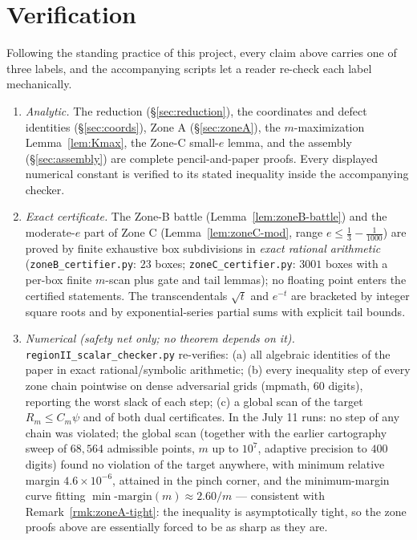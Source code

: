 \documentclass[11pt]{article}
\begin{document}
\section{Verification}\label{sec:verification}

Following the standing practice of this project, every claim above carries
one of three labels, and the accompanying scripts let a reader re-check each
label mechanically.

\begin{enumerate}[label=\textup{(\arabic*)}]
\item \emph{Analytic.}  The reduction (\S\ref{sec:reduction}), the
coordinates and defect identities (\S\ref{sec:coords}), Zone A
(\S\ref{sec:zoneA}), the $m$-maximization Lemma~\ref{lem:Kmax}, the Zone-C
small-$e$ lemma, and the assembly (\S\ref{sec:assembly}) are complete
pencil-and-paper proofs.  Every displayed numerical constant is verified to
its stated inequality inside the accompanying checker.
\item \emph{Exact certificate.}  The Zone-B battle
(Lemma~\ref{lem:zoneB-battle}) and the moderate-$e$ part of Zone C
(Lemma~\ref{lem:zoneC-mod}, range $e\le\tfrac13-\tfrac1{1000}$) are proved by
finite exhaustive box subdivisions in \emph{exact rational arithmetic}
(\texttt{zoneB\_certifier.py}: $23$ boxes; \texttt{zoneC\_certifier.py}:
$3001$ boxes with a per-box finite $m$-scan plus gate and tail lemmas); no floating point enters the certified
statements.  The transcendentals $\sqrt t$ and $e^{-t}$ are bracketed by
integer square roots and by exponential-series partial sums with explicit
tail bounds.
\item \emph{Numerical (safety net only; no theorem depends on it).}
\texttt{regionII\_scalar\_checker.py} re-verifies: (a) all algebraic
identities of the paper in exact rational/symbolic arithmetic; (b) every
inequality step of every zone chain pointwise on dense adversarial grids
(mpmath, $60$ digits), reporting the worst slack of each step; (c) a global
scan of the target $R_m\le C_m\psi$ and of both dual certificates.  In the
July 11 runs: no step of any chain was violated; the global scan (together
with the earlier cartography sweep of $68{,}564$ admissible points, $m$ up
to $10^7$, adaptive precision to $400$ digits) found no violation of the
target anywhere, with minimum relative margin $4.6\times10^{-6}$, attained
in the pinch corner, and the minimum-margin curve fitting
$\min\text{-margin}(m)\approx2.60/m$ --- consistent with
Remark~\ref{rmk:zoneA-tight}: the inequality is asymptotically tight, so
the zone proofs above are essentially forced to be as sharp as they are.
\end{enumerate}
\end{document}
